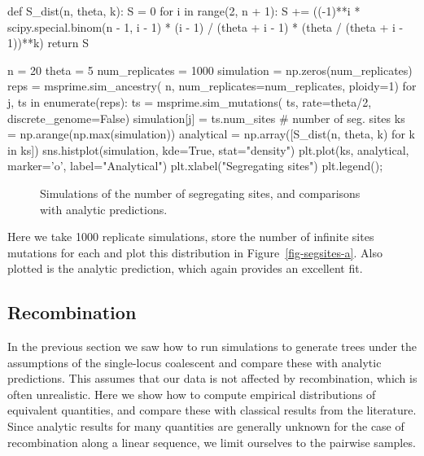 \documentclass[graybox]{svmult}
\begin{document}
\begin{pythoncode}
def S_dist(n, theta, k):
    S = 0
    for i in range(2, n + 1):
        S += ((-1)**i * scipy.special.binom(n - 1, i - 1)
            * (i - 1) / (theta + i - 1)
            * (theta / (theta + i - 1))**k)
    return S

n = 20
theta = 5
num_replicates = 1000
simulation = np.zeros(num_replicates)
reps = msprime.sim_ancestry(
    n, num_replicates=num_replicates, ploidy=1)
for j, ts in enumerate(reps):
    ts = msprime.sim_mutations(
        ts, rate=theta/2, discrete_genome=False)
    simulation[j] = ts.num_sites  # number of seg. sites
ks = np.arange(np.max(simulation))
analytical = np.array([S_dist(n, theta, k) for k in ks])
sns.histplot(simulation, kde=True, stat="density")
plt.plot(ks, analytical, marker='o', label="Analytical")
plt.xlabel("Segregating sites")
plt.legend();
\end{pythoncode}

\begin{figure}[t]
\centering
{}
\qquad\qquad
{}
\caption{\label{fig-segsites}
Simulations of the number of segregating sites, and
comparisons with analytic predictions.
}
\end{figure}

Here we take 1000 replicate simulations, store the number of infinite
sites mutations for each and plot this distribution in
Figure~\ref{fig-segsites-a}. Also plotted is the analytic prediction, which again provides an excellent fit.


\subsection{Recombination}

In the previous section we saw how to run simulations to generate trees
under the assumptions of the single-locus coalescent and compare these
with analytic predictions. This assumes that our data is not affected
by recombination, which is often unrealistic. Here we show how to
compute empirical distributions of equivalent quantities, and compare
these with classical results from the literature. Since analytic
results for many quantities are generally unknown for the case of recombination along a linear sequence, we limit ourselves to the pairwise samples.
\end{document}
